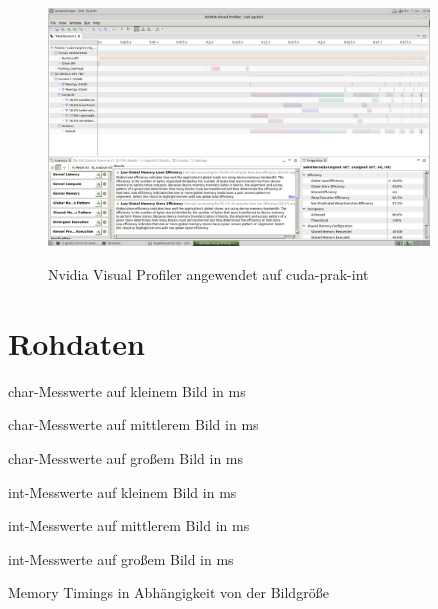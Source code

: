 \documentclass[12pt,a4paper]{scrartcl}
\begin{document}
\begin{figure}[H]
    \caption{Nvidia Visual Profiler angewendet auf cuda-prak-int}
    \includegraphics[width=0.9\textwidth]{Sobel_Int_Efficiency.png}
    \label{fig:sobelint}
\end{figure}

\section{Rohdaten}
\label{rohdaten}
\begin{table}[H]
    \centering
    \caption{char-Messwerte auf kleinem Bild in ms}
    \label{tab:messwerteklein}
\end{table}

\begin{table}[H]
    \centering
    \caption{char-Messwerte auf mittlerem Bild in ms}
    \label{tab:messwertemedium}
\end{table}

\begin{table}[H]
    \centering
    \caption{char-Messwerte auf gro\ss{}em Bild in ms}
    \label{tab:messwertelarge}
\end{table}

\begin{table}[H]
    \centering
    \caption{int-Messwerte auf kleinem Bild in ms}
    \label{tab:messwerteklein-int}
\end{table}

\begin{table}[H]
    \centering
    \caption{int-Messwerte auf mittlerem Bild in ms}
    \label{tab:messwertemediumint-}
\end{table}

\begin{table}[H]
    \centering
    \caption{int-Messwerte auf gro\ss{}em Bild in ms}
    \label{tab:messwertelarge-int}
\end{table}

\begin{table}[H]
    \centering
    \caption{Memory Timings in Abh\"angigkeit von der Bildgr\"o\ss{}e}
    \label{tab:memtimings}
\end{table}
\end{document}
